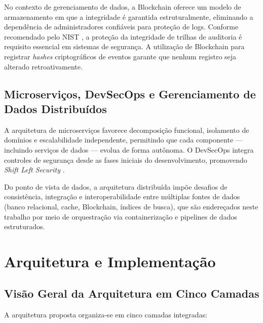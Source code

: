 \documentclass[12pt]{article}
\begin{document}
No contexto de gerenciamento de dados, a Blockchain oferece um modelo de armazenamento em que a integridade é garantida estruturalmente, eliminando a dependência de administradores confiáveis para proteção de logs. Conforme recomendado pelo NIST \cite{nist2020}, a proteção da integridade de trilhas de auditoria é requisito essencial em sistemas de segurança. A utilização de Blockchain para registrar \textit{hashes} criptográficos de eventos garante que nenhum registro seja alterado retroativamente.

\subsection{Microserviços, DevSecOps e Gerenciamento de Dados Distribuídos}

A arquitetura de microserviços \cite{newman2021} favorece decomposição funcional, isolamento de domínios e escalabilidade independente, permitindo que cada componente --- incluindo serviços de dados --- evolua de forma autônoma. O DevSecOps integra controles de segurança desde as fases iniciais do desenvolvimento, promovendo \textit{Shift Left Security} \cite{nist2020}.

Do ponto de vista de dados, a arquitetura distribuída impõe desafios de consistência, integração e interoperabilidade entre múltiplas fontes de dados (banco relacional, cache, Blockchain, índices de busca), que são endereçados neste trabalho por meio de orquestração via containerização e pipelines de dados estruturados.

\section{Arquitetura e Implementação}

\subsection{Visão Geral da Arquitetura em Cinco Camadas}

A arquitetura proposta organiza-se em cinco camadas integradas:
\end{document}
